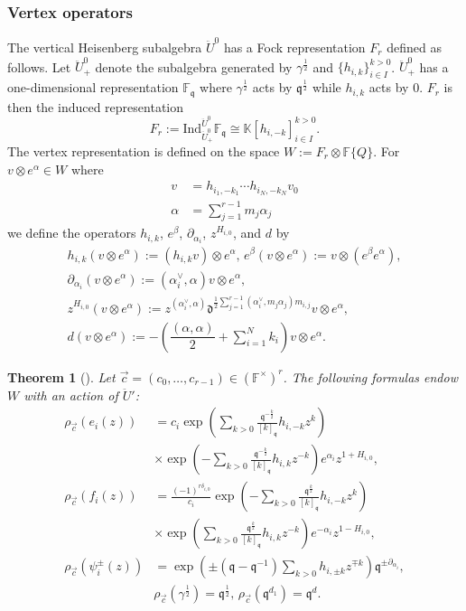 \documentclass{amsart}
\newcommand{\K}{\mathbb{K}}
\newcommand{\F}{\mathbb{F}}
\newcommand{\qqq}{\mathfrak{q}}
\newcommand{\ddd}{\mathfrak{d}}
\newtheorem{thm}{Theorem}
\theoremstyle{remark}
\numberwithin{thm}{section}
\numberwithin{equation}{section}
\begin{document}
\subsubsection{Vertex operators}
The vertical Heisenberg subalgebra $\ddot{U}^0$ has a Fock representation $F_r$ defined as follows.
Let $\ddot{U}^0_+$ denote the subalgebra generated by $\gamma^{\frac{1}{2}}$ and $\{h_{i,k}\}_{i\in I}^{k>0}$.
$\ddot{U}^0_+$ has a one-dimensional representation $\F_{\qqq}$ where $\gamma^{\frac{1}{2}}$ acts by $\qqq^{\frac{1}{2}}$ while $h_{i,k}$ acts by $0$.
$F_r$ is then the induced representation
\[
F_r:=\mathrm{Ind}_{\ddot{U}^0_+}^{\ddot{U}^0}\F_{\qqq}\cong\K[h_{i,-k}]_{i\in I}^{k>0}.
\]
The vertex representation is defined on the space $W:=F_r\otimes\F\{Q\}$.
For $v\otimes e^\alpha \in W$ where
\begin{align*}
v&=h_{i_1,-k_1}\cdots h_{i_N,-k_N} v_0\\
\alpha&=\sum_{j=1}^{r-1}m_j\alpha_j
\end{align*}
we define the operators $h_{i,k}$, $e^\beta$, $\partial_{\alpha_i}$, $z^{H_{i,0}}$, and $d$ by
\begin{gather}
\nonumber
h_{i,k}(v\otimes e^\alpha ):=(h_{i,k}v)\otimes e^\alpha ,\, e^\beta(v\otimes e^\alpha ):=v\otimes(e^\beta e^\alpha ),\\
\nonumber
\partial_{\alpha_i}(v\otimes e^\alpha ):=\left( \alpha^\vee_i,\alpha\right) v\otimes e^\alpha ,\\
\label{ZHi}
z^{H_{i,0}}(v\otimes e^\alpha ):=z^{\left( \alpha^\vee_i,\alpha\right)} \ddd^{\frac{1}{2}\sum_{j=1}^{r-1}\left( \alpha^\vee_i,m_j\alpha_j\right) m_{i,j}}v\otimes e^\alpha ,\\
\nonumber
d(v\otimes e^\alpha ):=-\left(\dfrac{(\alpha,\alpha)}{2}+\sum_{i=1}^N k_i\right)v\otimes e^\alpha. 
\end{gather}

\begin{thm}[\cite{Saito}]\label{VertexRep}
Let $\vec{c}=(c_0,\ldots, c_{r-1})\in(\F^\times)^r$.
The following formulas endow $W$ with an action of $\ddot{U}'$:
\begin{align*}
\rho_{\vec{c}}(e_i(z))&=c_i\exp\left(\sum_{k>0}\frac{\qqq^{-\frac{k}{2}}}{[k]_{\qqq}}h_{i,-k}z^k\right)\\
&\times\exp\left(-\sum_{k>0}\frac{\qqq^{-\frac{k}{2}}}{[k]_{\qqq}}h_{i,k}z^{-k}\right)e^{\alpha_i} z^{1+H_{i,0}},\\
\rho_{\vec{c}}(f_i(z))&=\frac{(-1)^{r\delta_{i,0}}}{c_i}\exp\left(-\sum_{k>0}\frac{\qqq^{\frac{k}{2}}}{[k]_{\qqq}}h_{i,-k}z^k\right)\\
&\times\exp\left(\sum_{k>0}\frac{\qqq^{\frac{k}{2}}}{[k]_{\qqq}}h_{i,k}z^{-k}\right)e^{-\alpha_i} z^{1-H_{i,0}},\\
\rho_{\vec{c}}(\psi_i^\pm(z))&=\exp\left(\pm(\qqq-\qqq^{-1})\sum_{k>0}h_{i,\pm k}z^{\mp k}\right)\qqq^{\pm\partial_{\alpha_i}},\\
&\rho_{\vec{c}}(\gamma^{\frac{1}{2}})=\qqq^{\frac{1}{2}},\,\rho_{\vec{c}}(\qqq^{d_1})=\qqq^{d}.
\end{align*}
\end{thm}
\end{document}
